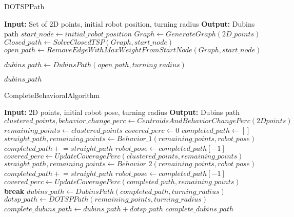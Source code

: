 \begin{algorithm}
    \caption{DOTSPPath}
    \begin{algorithmic}[1]
        \Statex \textbf{Input:} Set of 2D points, initial robot position, turning radius
        \Statex \textbf{Output:} Dubins path
        \newline
        \State $start\_node \gets initial\_robot\_position$
        \State $Graph \gets GenerateGraph(2D\_points)$
        \State $Closed\_path \gets SolveClosedTSP(Graph, start\_node)$
        \State $open\_path \gets RemoveEdgeWithMaxWeightFromStartNode(Graph, start\_node)$
        
        \State $dubins\_path \gets DubinsPath(open\_path, turning\_radius)$
        
        \State \Return $dubins\_path$
    \end{algorithmic}
\end{algorithm}

\begin{algorithm}
    \caption{CompleteBehavioralAlgorithm}
    \begin{algorithmic}[1]
        \Statex \textbf{Input:} 2D points, initial robot pose, turning radius
        \Statex \textbf{Output:} Dubins path
        \newline
        \State $clustered\_points, behavior\_change\_perc \gets CentroidsAndBehaviorChangePerc(2D points)$
        \State $remaining\_points \gets clustered\_points$ 
        \State $covered\_perc \gets 0$
        \State $completed\_path \gets []$
                \State $straight\_path, remaining\_points \gets Behavior\_1(remaining\_points, robot\_pose)$
                \State $completed\_path \mathrel{+}= straight\_path$
                \State $robot\_pose \gets completed\_path[-1]$
                \State $covered\_perc \gets UpdateCoveragePerc(clustered\_points, remaining\_points)$
            \Else
                \State $straight\_path, remaining\_points \gets Behavior\_2(remaining\_points, robot\_pose)$
                \State $completed\_path \mathrel{+}= straight\_path$
                \State $robot\_pose \gets completed\_path[-1]$
                \State $covered\_perc \gets UpdateCoveragePerc(completed\_path, remaining\_points)$
            \EndIf
                \State \textbf{break}
            \EndIf
        \EndWhile
        \State $dubins\_path \gets DubinsPath(completed\_path, turning\_radius)$
        \State $dotsp\_path \gets DOTSPPath(remaining\_points, turning\_radius)$
        \State $complete\_dubins\_path \gets dubins\_path + dotsp\_path$
        \State \Return $complete\_dubins\_path$
    \end{algorithmic}
\end{algorithm}



